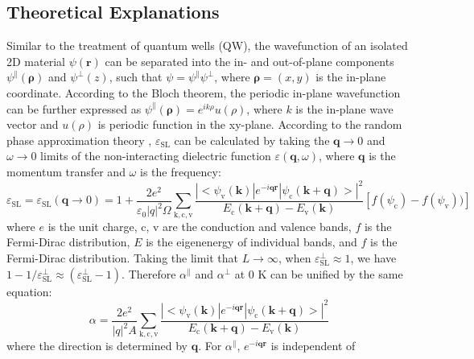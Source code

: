 \documentclass[journal=ancac3,manuscript=article,email=true,hyperref=true,keywords=false]{achemso}
\begin{document}
\iffalse
\subsection{Theoretical Explanations}
\label{sec:theory}

Similar to the treatment of quantum wells (QW), the wavefunction of an
isolated 2D material $\psi(\mathbf{r})$ can be separated into the in-
and out-of-plane components \cite{davies_physics_1997}
$\psi^{\parallel}(\mathbf{\rho})$ and $\psi^{\perp}(z)$, such that
$\psi=\psi^{\parallel}\psi^{\perp}$, where $\mathbf{\rho}=(x, y)$ is
the in-plane coordinate. According to the Bloch theorem, the periodic
in-plane wavefunction can be further expressed as
$\psi^{\parallel}(\mathbf{\rho})=e^{ik\rho}u(\rho)$, where $k$ is the
in-plane wave vector and $u(\rho)$ is periodic function in the
xy-plane. According to the random phase approximation theory
\cite{Adler_1962}, $\varepsilon_{\mathrm{SL}}$ can be calculated by
taking the $\mathbf{q} \to 0$ and $\omega \to 0$ limits of the
non-interacting dielectric function $\varepsilon(\mathbf{q}, \omega)$,
where $\mathbf{q}$ is the momentum transfer and $\omega$ is the
frequency:
\begin{equation}
  \label{eq:RPA-eps2}
  \varepsilon_{\mathrm{SL}}
  = \varepsilon_{\mathrm{SL}}(\mathbf{q} \to 0)
  = 1 + \frac{2e^{2}}{\varepsilon_{0} |q|^{2} \Omega}
  \sum_{\mathrm{k, c, v}}
  \frac{|<\psi_{\mathrm{v}}(\mathbf{k})|e^{-i\mathbf{q}\mathbf{r}}|\psi_{\mathrm{c}}(\mathbf{k+q})>|^{2}}
  {E_{\mathrm{c}}(\mathbf{k+q}) - E_{\mathrm{v}}(\mathbf{k})}
  \left[f(\psi_{\mathrm{c}}) - f(\psi_{\mathrm{v}}))\right]
\end{equation}
where $e$ is the unit charge, c, v are the conduction and valence
bands, $f$ is the Fermi-Dirac distribution, $E$ is the eigenenergy of
individual bands, and $f$ is the Fermi-Dirac distribution. Taking the
limit that $L\to\infty$, when
$\varepsilon^{\perp}_{\mathrm{SL}} \approx 1$, we have
$1-1/\varepsilon^{\perp}_{\mathrm{SL}} \approx
(\varepsilon_{\mathrm{SL}}^{\perp} - 1)$. Therefore $\alpha^{\parallel}$ and $\alpha^{\perp}$ at 0 K can be unified by the same equation:
\begin{equation}
  \label{eq:alpha-RPA}
  \alpha = \frac{2e^{2}}{|q|^{2}A} \sum_{\mathrm{k,c,v}}
  \frac{|<\psi_{\mathrm{v}}(\mathbf{k})|e^{-i\mathbf{q}\mathbf{r}}|\psi_{\mathrm{c}}(\mathbf{k+q})>|^{2}}
  {E_{\mathrm{c}}(\mathbf{k+q}) - E_{\mathrm{v}}(\mathbf{k})}
\end{equation}
where the direction is determined by $\mathbf{q}$. For
$\alpha^{\parallel}$, $e^{-i\mathbf{qr}}$ is independent of
\end{document}
